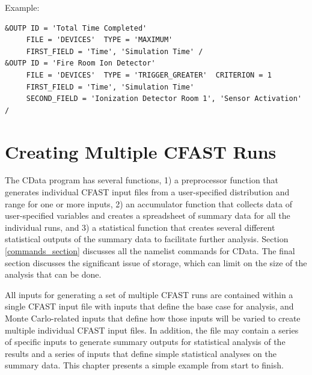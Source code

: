 \documentclass[12pt,twoside]{book}
\begin{document}
\vspace{\baselineskip}
\noindent Example:
\begin{lstlisting}[language=cdata, basicstyle=\scriptsize]
&OUTP ID = 'Total Time Completed'
     FILE = 'DEVICES'  TYPE = 'MAXIMUM'
     FIRST_FIELD = 'Time', 'Simulation Time' /
&OUTP ID = 'Fire Room Ion Detector'
     FILE = 'DEVICES'  TYPE = 'TRIGGER_GREATER'  CRITERION = 1
     FIRST_FIELD = 'Time', 'Simulation Time'
     SECOND_FIELD = 'Ionization Detector Room 1', 'Sensor Activation' /
\end{lstlisting}

\clearpage

%
%


\chapter{Creating Multiple CFAST Runs}
The CData program has several functions, 1) a preprocessor function that generates individual CFAST input files from a user-specified distribution and range for one or more inputs, 2) an accumulator function that collects  data of user-specified variables and creates a spreadsheet of summary data for all the individual runs, and 3) a statistical function that creates several different statistical outputs of the summary data to facilitate further analysis.  Section \ref{commands_section} discusses all the namelist commands for CData. The final section discusses the significant issue of storage, which can limit on the size of the analysis that can be done.

All inputs for generating a set of multiple CFAST runs are contained within a single CFAST input file with inputs that define the base case for analysis, and Monte Carlo-related inputs that define how those inputs will be varied to create multiple individual CFAST input files. In addition, the file may contain a series of specific inputs to generate summary outputs for statistical analysis of the results and a series of inputs that define simple statistical analyses on the summary data.  This chapter presents a simple example from start to finish.
\end{document}
